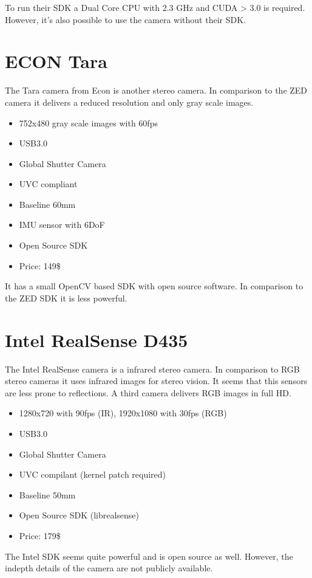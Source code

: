 \documentclass[11pt,a4paper,titlepage,oneside]{report}
\begin{document}
To run their SDK a Dual Core CPU with 2.3 GHz and CUDA > 3.0 is required. However, it's also possible to use the camera without their SDK.

\section{ECON Tara}
The Tara camera \cite{tara} from Econ is another stereo camera. In comparison to the ZED camera it delivers a reduced resolution and only gray scale images.
\begin{itemize}
	\item 752x480 gray scale images with 60fps
	\item USB3.0
	\item Global Shutter Camera
	\item UVC compliant
	\item Baseline 60mm
	\item IMU sensor with 6DoF
	\item Open Source SDK
	\item Price: 149\$
\end{itemize}

It has a small OpenCV based SDK with open source software. In comparison to the ZED SDK it is less powerful.

\section{Intel RealSense D435}
The Intel RealSense camera \cite{realsense} is a infrared stereo camera. In comparison to RGB stereo cameras it uses infrared images for stereo vision. It seems that this sensors are less prone to reflections. A third camera delivers RGB images in full HD.
\begin{itemize}
	\item 1280x720 with 90fps (IR), 1920x1080 with 30fps (RGB)
	\item USB3.0
	\item Global Shutter Camera
	\item UVC compilant (kernel patch required)
	\item Baseline 50mm
	\item Open Source SDK (librealsense)
	\item Price: 179\$
\end{itemize}

The Intel SDK seems quite powerful and is open source as well. However, the indepth details of the camera are not publicly available.
\end{document}
